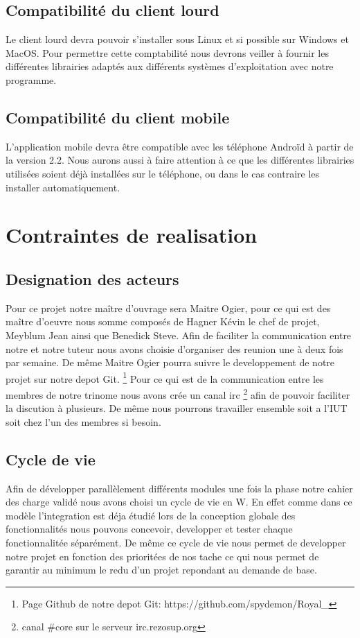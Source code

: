\subsection{Compatibilité du client lourd}
Le client lourd devra pouvoir s'installer sous Linux et si possible sur Windows et MacOS. 
Pour permettre cette comptabilité nous devrons veiller à fournir les différentes librairies adaptés aux différents systèmes d'exploitation avec notre programme. 

\subsection{Compatibilité du client mobile}
L'application mobile devra être compatible avec les téléphone Androïd à partir de la version 2.2. 
Nous aurons aussi à faire attention à ce que les différentes librairies utilisées soient déjà installées sur le téléphone, ou dans le cas contraire les installer automatiquement.

\section{Contraintes de realisation}

\subsection{Designation des acteurs}
Pour ce projet notre maître d'ouvrage sera Maitre Ogier, pour ce qui est des maître d'oeuvre nous somme composés de Hagner Kévin le chef de projet, Meyblum Jean ainsi que Benedick Steve.
Afin de faciliter la communication entre notre et notre tuteur nous avons choisie d'organiser des reunion une à deux fois par semaine. De même Maitre Ogier pourra suivre le developpement de notre projet sur notre depot Git.
\footnote{Page Github de notre depot Git: https://github.com/spydemon/Royal\_} 
Pour ce qui est de la communication entre les membres de notre trinome nous avons crée un canal irc \footnote{ canal \#core sur le serveur irc.rezosup.org} afin de pouvoir faciliter la discution à plusieurs. 
De même nous pourrons travailler ensemble soit a l'IUT soit chez l'un des membres si besoin.

\subsection{Cycle de vie}
Afin de développer parallèlement différents modules une fois la phase notre cahier des charge validé nous avons choisi un cycle de vie en W. 
En effet comme dans ce modèle l'integration est déja étudié lors de la conception globale des fonctionnalités nous pouvons concevoir, developper et tester chaque fonctionnalitée séparément. 
De même ce cycle de vie nous permet de developper notre projet en fonction des prioritées de nos tache ce qui nous permet de garantir au minimum le redu d'un projet repondant au demande de base.
